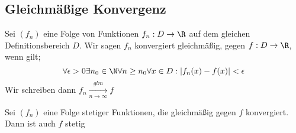 	\subsection{Gleichmäßige Konvergenz}
		\begin{Definition} 
			Sei $(f_n)$ eine Folge von Funktionen $f_n: D\to\R$ auf dem gleichen Definitionsbereich $D$. Wir sagen $f_n$ konvergiert gleichmäßig, gegen $f: D\to\R$, wenn gilt;
			$$
				\forall \epsilon > 0\exists n_0\in\N\forall n\geq n_0\forall x \in D: |f_n(x)-f(x)|<\epsilon
			$$
			Wir schreiben dann $f_n\xrightarrow[n\to\infty]{glm}f$
		\end{Definition}
		\begin{Satz} [ ]
			Sei $(f_n)$ eine Folge stetiger Funktionen, die gleichmäßig gegen $f$ konvergiert. Dann ist auch $f$ stetig
		\end{Satz}

		
		
		
					
			